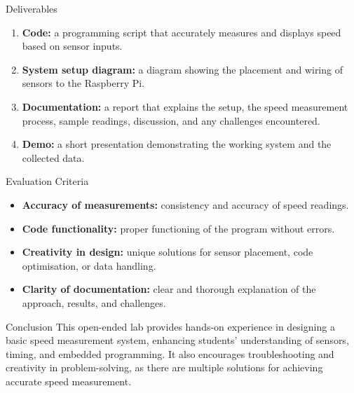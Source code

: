 \begin{labsection}{Deliverables}
  \begin{enumerate}
    \item \textbf{Code:} a programming script that accurately measures and displays speed based on sensor inputs.
    \item \textbf{System setup diagram:} a diagram showing the placement and wiring of sensors to the Raspberry Pi.
    \item \textbf{Documentation:} a report that explains the setup, the speed measurement process, sample readings, discussion, and any challenges encountered.
    \item \textbf{Demo:} a short presentation demonstrating the working system and the collected data.
  \end{enumerate}
\end{labsection}

\begin{labsection}{Evaluation Criteria}
  \begin{itemize}
    \item \textbf{Accuracy of measurements:} consistency and accuracy of speed readings.
    \item \textbf{Code functionality:} proper functioning of the program without errors.
    \item \textbf{Creativity in design:} unique solutions for sensor placement, code optimisation, or data handling.
    \item \textbf{Clarity of documentation:} clear and thorough explanation of the approach, results, and challenges.
  \end{itemize}
\end{labsection}

\begin{labsection}{Conclusion}
  This open-ended lab provides hands-on experience in designing a basic speed measurement system, enhancing students' understanding of sensors, timing, and embedded programming. It also encourages troubleshooting and creativity in problem-solving, as there are multiple solutions for achieving accurate speed measurement.
\end{labsection}


